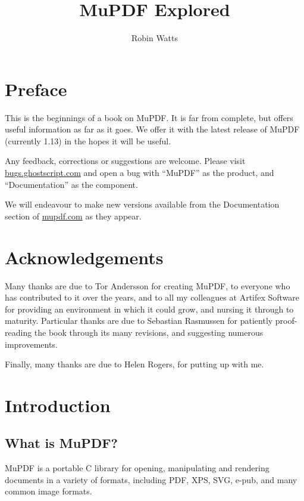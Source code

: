 \documentclass[oneside]{book}
\begin{document}
\title{MuPDF Explored}
\author{Robin Watts}

\maketitle

\frontmatter

\chapter{Preface}

This is the beginnings of a book on MuPDF. It is far from complete, but offers useful information as far as it goes. We offer it with the latest release of MuPDF (currently 1.13) in the hopes it will be useful.

Any feedback, corrections or suggestions are welcome. Please visit \url{bugs.ghostscript.com} and open a bug with ``MuPDF'' as the product, and ``Documentation'' as the component.

We will endeavour to make new versions available from the Documentation section of \url{mupdf.com} as they appear.


\chapter{Acknowledgements}

Many thanks are due to Tor Andersson for creating MuPDF, to everyone who has contributed to it over the years, and to all my colleagues at Artifex Software for providing an environment in which it could grow, and nursing it through to maturity. Particular thanks are due to Sebastian Rasmussen for patiently proof-reading the book through its many revisions, and suggesting numerous improvements.

Finally, many thanks are due to Helen Rogers, for putting up with me.

\tableofcontents

\mainmatter

\chapter{Introduction}
\label{Introduction}


\section{What is MuPDF?}

MuPDF is a portable C library for opening, manipulating and rendering documents in a variety of formats, including PDF, XPS, SVG, e-pub, and many common image formats.
\end{document}
